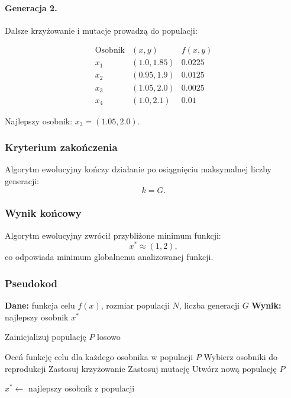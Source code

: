 \documentclass[10pt,a4paper]{article}
\begin{document}
\paragraph{Generacja 2.}

Dalsze krzyżowanie i mutacje prowadzą do populacji:

\[
\begin{array}{c|c|c}
\text{Osobnik} & (x,y) & f(x,y) \\ \hline
x_1 & (1.0,1.85) & 0.0225 \\
x_2 & (0.95,1.9) & 0.0125 \\
x_3 & (1.05,2.0) & 0.0025 \\
x_4 & (1.0,2.1) & 0.01
\end{array}
\]

Najlepszy osobnik: $x_3=(1.05,2.0)$.



\subsubsection{Kryterium zakończenia}

Algorytm ewolucyjny kończy działanie po osiągnięciu maksymalnej liczby
generacji:
\[
k = G.
\]



\subsubsection{Wynik końcowy}

Algorytm ewolucyjny zwrócił przybliżone minimum funkcji:
\[
x^\ast \approx (1,2),
\]
co odpowiada minimum globalnemu analizowanej funkcji.

\subsubsection{Pseudokod}

\begin{algorithm}[H]
\caption{Algorytm genetyczny}
\begin{algorithmic}[1]
\STATE \textbf{Dane:} funkcja celu $f(x)$, rozmiar populacji $N$, liczba generacji $G$
\STATE \textbf{Wynik:} najlepszy osobnik $x^\ast$

\STATE Zainicjalizuj populację $P$ losowo

    \STATE Oceń funkcję celu dla każdego osobnika w populacji $P$
    \STATE Wybierz osobniki do reprodukcji
    \STATE Zastosuj krzyżowanie
    \STATE Zastosuj mutację
    \STATE Utwórz nową populację $P$
\ENDFOR

\STATE $x^\ast \leftarrow$ najlepszy osobnik z populacji
\end{algorithmic}
\end{algorithm}
\end{document}
